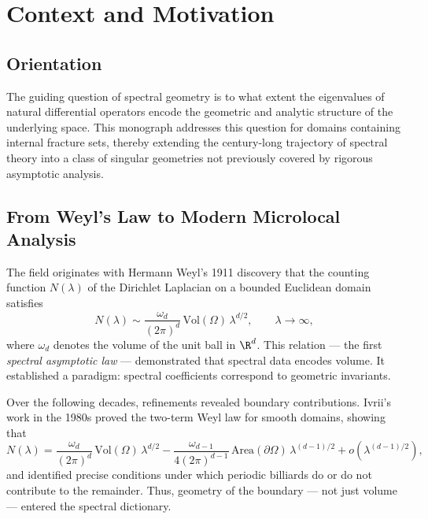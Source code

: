 \section{Context and Motivation}
\label{sec:intro-context}

\subsection{Orientation}

The guiding question of spectral geometry is to what extent 
the eigenvalues of natural differential operators encode the 
geometric and analytic structure of the underlying space. 
This monograph addresses this question for domains containing 
internal fracture sets, thereby extending the century-long 
trajectory of spectral theory into a class of singular geometries 
not previously covered by rigorous asymptotic analysis.

\subsection{From Weyl’s Law to Modern Microlocal Analysis}

The field originates with Hermann Weyl’s 1911 discovery 
\cite{Weyl1911} that the counting function $N(\lambda)$ of the 
Dirichlet Laplacian on a bounded Euclidean domain satisfies
\[
  N(\lambda) \sim \frac{\omega_d}{(2\pi)^d} \, \mathrm{Vol}(\Omega) \, \lambda^{d/2},
  \qquad \lambda \to \infty,
\]
where $\omega_d$ denotes the volume of the unit ball in $\R^d$. 
This relation --- the first \emph{spectral asymptotic law} --- 
demonstrated that spectral data encodes volume. 
It established a paradigm: spectral coefficients correspond 
to geometric invariants.

Over the following decades, refinements revealed boundary 
contributions. Ivrii’s work in the 1980s \cite{Ivrii1980} 
proved the two-term Weyl law for smooth domains, showing that 
\[
  N(\lambda) = \frac{\omega_d}{(2\pi)^d} \, \mathrm{Vol}(\Omega) \, \lambda^{d/2}
    - \frac{\omega_{d-1}}{4(2\pi)^{d-1}} \, \mathrm{Area}(\partial\Omega) \, \lambda^{(d-1)/2}
    + o(\lambda^{(d-1)/2}),
\]
and identified precise conditions under which periodic billiards 
do or do not contribute to the remainder. 
Thus, geometry of the boundary --- not just volume --- entered 
the spectral dictionary.

